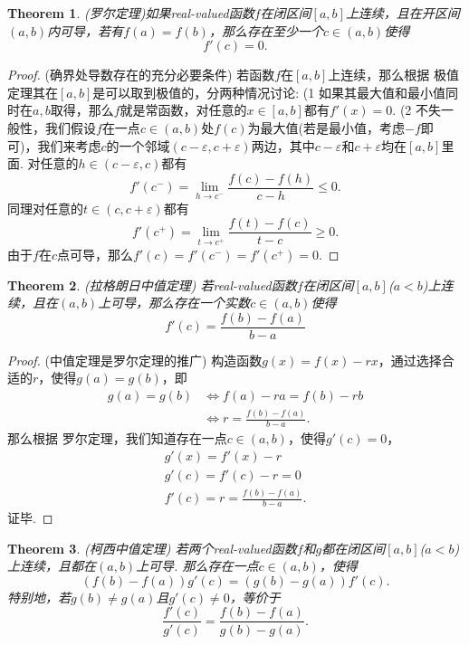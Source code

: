 \documentclass{article}
\newtheorem{theorem}{Theorem}[section]
\begin{document}
\begin{theorem}
\rm {\color{red} (罗尔定理)}如果real-valued函数$f$在闭区间$[a,b]$上连续，且在开区间$(a,b)$内可导，若有$f(a) = f(b)$，那么存在至少一个$c \in (a,b)$使得
$$
f'(c) = 0.
$$
\end{theorem}

\begin{proof}
{\color{blue} (确界处导数存在的充分必要条件)} 若函数$f$在$[a,b]$上连续，那么根据{\color{red} 极值定理}其在$[a,b]$是可以取到极值的，分两种情况讨论: (1 如果其最大值和最小值同时在$a,b$取得，那么$f$就是常函数，对任意的$x \in [a,b]$都有$f'(x) = 0$. (2 不失一般性，我们假设$f$在一点$c \in (a,b)$处$f(c)$为最大值(若是最小值，考虑$-f$即可)，我们来考虑$c$的一个邻域$(c-\varepsilon, c+\varepsilon)$两边，其中$c-\varepsilon$和$c+\varepsilon$均在$[a,b]$里面. 对任意的$h \in (c-\varepsilon, c)$都有
$$
f'(c^-) = \lim\limits_{h \rightarrow c^-}\frac{f(c)- f(h)}{c-h} \leq 0. 
$$
同理对任意的$t \in (c,c+\varepsilon)$都有
$$
f'(c^+) = \lim\limits_{t \rightarrow c^+}\frac{f(t)-f(c)}{t-c} \geq 0.
$$
由于$f$在$c$点可导，那么$f'(c) = f'(c^-) = f'(c^+) = 0$.
\end{proof}


\begin{theorem}
\rm {\color{red} (拉格朗日中值定理)} 若real-valued函数$f$在闭区间$[a,b]$($a < b$)上连续，且在$(a,b)$上可导，那么存在一个实数$c \in (a,b)$使得
$$
f'(c) = \frac{f(b) - f(a)}{b-a}
$$ 
\end{theorem}

\begin{proof}
{\color{blue} (中值定理是罗尔定理的推广)} 构造函数$g(x) = f(x) - rx$，通过选择合适的$r$，使得$g(a) = g(b)$，即
$$
\begin{array}{ll}
g(a) = g(b) &\Leftrightarrow f(a) - ra = f(b) - rb \\
			&\Leftrightarrow r = \frac{f(b) - f(a)}{b-a}.
\end{array} 
$$
那么根据{\color{red} 罗尔定理}，我们知道存在一点$c \in (a,b)$，使得$g'(c) = 0$，
$$
\begin{array}{ll}
g'(x) = f'(x) - r \\
g'(c) = f'(c) - r = 0 \\
f'(c) = r = \frac{f(b) - f(a)}{b-a}.
\end{array}  
$$
证毕.
\end{proof}


\begin{theorem}
\rm {\color{red} (柯西中值定理)} 若两个real-valued函数$f$和$g$都在闭区间$[a,b]$($a < b$)上连续，且都在$(a,b)$上可导. 那么存在一点$c \in (a,b)$，使得
$$
(f(b) - f(a))g'(c) = (g(b) - g(a))f'(c). 
$$
特别地，若$g(b) \neq g(a)$且$g'(c) \neq 0$，等价于
$$
\frac{f'(c)}{g'(c)} = \frac{f(b)-f(a)}{g(b) - g(a)}.
$$
\end{theorem}
\end{document}
